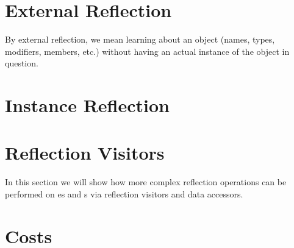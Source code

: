 \section{External Reflection}
\label{sec:reflection_external}

By external reflection, we mean learning about an object (names, types, modifiers, members, etc.) without having an actual instance of the object in question.  

\section{Instance Reflection}
\label{sec:reflection_instance}

\section{Reflection Visitors}
\label{sec:reflection_visitors}

In this section we will show how more complex reflection operations can be performed on es and s via reflection visitors and data accessors.

\section{Costs}
\label{sec:reflection_costs}


